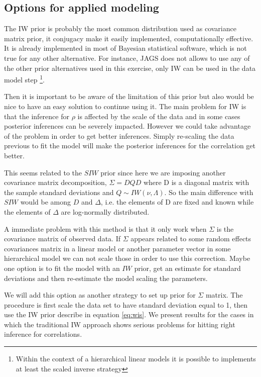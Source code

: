 \documentclass{article}
\begin{document}
\subsection{Options for applied modeling}

The IW prior is probably the most common distribution used as covariance matrix prior, it conjugacy make it easily implemented, computationally effective. It is already implemented in most of Bayesian statistical software, which is not true for any other alternative. For instance, JAGS does not allows to use any of the other prior alternatives used in this exercise, only IW can be used in the data model step \footnote{Within the context of a hierarchical linear models it is possible to implements at least the scaled inverse strategy}.  

Then it is important to be aware of the limitation of this prior but also would be nice to have an easy solution to continue using it. The main problem for IW is that the inference for $\rho$ is affected by the scale of the data and in some cases posterior inferences can be severely impacted. However we could take advantage of the problem in order to get better inferences. Simply re-scaling the data previous to fit the model will make the posterior inferences for the correlation get better. 

This seems related to the $SIW$ prior since here we are imposing another covariance matrix decomposition, $\Sigma = DQD$ where D is a diagonal matrix with the sample standard deviations and $Q\sim IW(\nu, \Lambda)$. So the main difference with $SIW$ would be among $D$ and $\Delta$, i.e. the elements of D are fixed and known while the elements of $\Delta$ are log-normally distributed. 

A immediate problem with this method is that it only work when $\Sigma$ is the covariance matrix of observed data. If $\Sigma$ appears related to some random effects covariances matrix in a linear model or another parameter vector in some hierarchical model we can not scale those in order to use this correction.  Maybe one option is to fit the model with an $IW$ prior, get an estimate for standard deviations and then re-estimate the model scaling the parameters.

We will add this option as another strategy to set up prior for $\Sigma$ matrix. The procedure is first scale the data set to have standard deviation equal to 1, then use the IW prior describe in equation \ref{eq:wis}. We present results for the cases in which the traditional IW approach shows serious problems for hitting right inference for correlations. 
\end{document}
